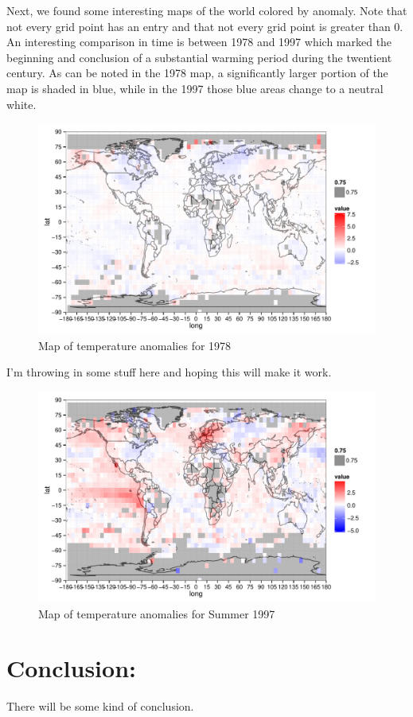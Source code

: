 \documentclass{article}\usepackage{graphicx, color}
\newenvironment{knitrout}{}{} %
\begin{document}
Next, we found some interesting maps of the world colored by anomaly. Note that not every grid point has an entry and that not every grid point is greater than 0. An interesting comparison in time is between 1978 and 1997 which marked the beginning and conclusion of a substantial warming period during the twentient century. As can be noted in the 1978 map, a significantly larger portion of the map is shaded in blue, while in the 1997 those blue areas change to a neutral white. 

\begin{figure}[H]
\begin{knitrout}
\color{fgcolor}\includegraphics[width=\linewidth]{figure/1978-map} 
\end{knitrout}

\caption{\label{1978map}Map of temperature anomalies for 1978}
\end{figure}

I'm throwing in some stuff here and hoping this will make it work.

\begin{figure}[H]
\begin{knitrout}
\color{fgcolor}\includegraphics[width=\linewidth]{figure/second1997map} 
\end{knitrout}

\caption{\label{another1997map}Map of temperature anomalies for Summer 1997}
\end{figure}



\section{Conclusion:}
There will be some kind of conclusion.
\end{document}
